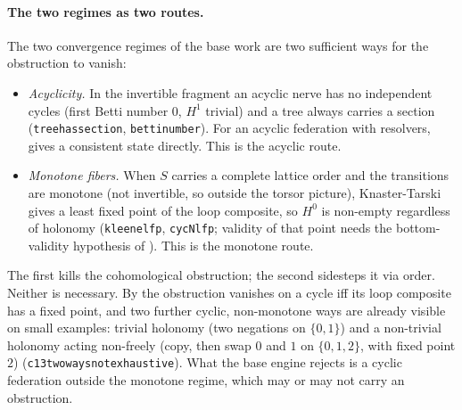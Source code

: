 \documentclass[11pt,a4paper]{article}
\theoremstyle{plain}
\theoremstyle{definition}
\theoremstyle{remark}
\newcommand{\Hz}{H^0}
\newcommand{\Ho}{H^1}
\renewcommand{\_}{\origunderscore\allowbreak}
\begin{document}
\paragraph{The two regimes as two routes.} The two convergence regimes of the base work are two
sufficient ways for the obstruction to vanish:
\begin{itemize}[leftmargin=*]
\item \emph{Acyclicity.} In the invertible fragment an acyclic nerve has no independent cycles (first
  Betti number $0$, $\Ho$ trivial) and a tree always carries a section (\texttt{tree\_has\_section},
  \texttt{betti\_number}). For an acyclic federation with resolvers,  gives a
  consistent state directly. This is the acyclic route.
\item \emph{Monotone fibers.} When $S$ carries a complete lattice order and the transitions are
  monotone (not invertible, so outside the torsor picture), Knaster-Tarski gives a least fixed point
  of the loop composite, so $\Hz$ is non-empty regardless of holonomy (\texttt{kleene\_lfp},
  \texttt{cyc\_N\_lfp}; validity of that point needs the bottom-validity hypothesis of
  ). This is the monotone route.
\end{itemize}
The first kills the cohomological obstruction; the second sidesteps it via order. Neither is
necessary. By  the obstruction vanishes on a cycle iff its loop composite has a
fixed point, and two further cyclic, non-monotone ways are already visible on small examples: trivial
holonomy (two negations on $\{0,1\}$) and a non-trivial holonomy acting non-freely (copy, then swap
$0$ and $1$ on $\{0,1,2\}$, with fixed point $2$) (\texttt{c13\_two\_ways\_not\_exhaustive}). What the
base engine rejects is a cyclic federation outside the monotone regime, which may or may not carry
an obstruction.
\end{document}
